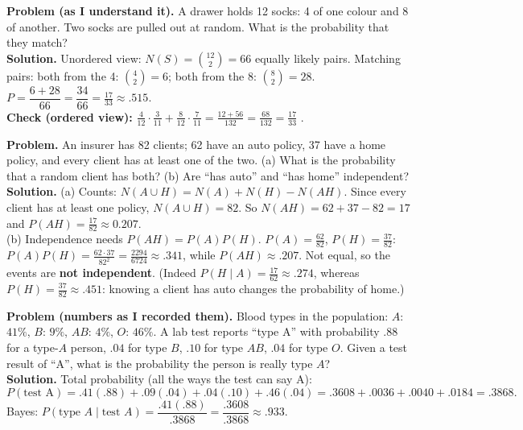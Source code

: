 \documentclass[11pt]{article}
\begin{document}
\begin{exbox}[\#5 Socks]
\textbf{Problem (as I understand it).} A drawer holds 12 socks: 4 of one colour and 8 of another. Two socks are pulled out at random. What is the probability that they match?\\
\textbf{Solution.} Unordered view: $N(S)=\binom{12}2=66$ equally likely pairs. Matching pairs: both from the 4: $\binom42=6$; both from the 8: $\binom82=28$. $P=\dfrac{6+28}{66}=\dfrac{34}{66}=\boxed{\tfrac{17}{33}}\approx.515$.\\
\textbf{Check (ordered view):} $\tfrac4{12}\cdot\tfrac3{11}+\tfrac8{12}\cdot\tfrac7{11}=\tfrac{12+56}{132}=\tfrac{68}{132}=\tfrac{17}{33}$ \checkmark.
\end{exbox}

\begin{exbox}
\textbf{Problem.} An insurer has 82 clients; 62 have an auto policy, 37 have a home policy, and every client has at least one of the two. (a) What is the probability that a random client has both? (b) Are ``has auto'' and ``has home'' independent?\\
\textbf{Solution.} (a) Counts: $N(A\cup H)=N(A)+N(H)-N(AH)$. Since every client has at least one policy, $N(A\cup H)=82$. So $N(AH)=62+37-82=17$ and $P(AH)=\tfrac{17}{82}\approx\boxed{0.207}$.\\
(b) Independence needs $P(AH)=P(A)P(H)$. $P(A)=\tfrac{62}{82}$, $P(H)=\tfrac{37}{82}$: $P(A)P(H)=\tfrac{62\cdot37}{82^2}=\tfrac{2294}{6724}\approx.341$, while $P(AH)\approx.207$. Not equal, so the events are \textbf{not independent}. (Indeed $P(H\mid A)=\tfrac{17}{62}\approx.274$, whereas $P(H)=\tfrac{37}{82}\approx.451$: knowing a client has auto changes the probability of home.)
\end{exbox}

\begin{exbox}
\textbf{Problem (numbers as I recorded them).} Blood types in the population: $A$: $41\%$, $B$: $9\%$, $AB$: $4\%$, $O$: $46\%$. A lab test reports ``type A'' with probability $.88$ for a type-$A$ person, $.04$ for type $B$, $.10$ for type $AB$, $.04$ for type $O$. Given a test result of ``A'', what is the probability the person is really type $A$?\\
\textbf{Solution.} Total probability (all the ways the test can say A):
\[ P(\text{test A})=.41(.88)+.09(.04)+.04(.10)+.46(.04)=.3608+.0036+.0040+.0184=.3868. \]
Bayes: $P(\text{type }A\mid\text{test }A)=\dfrac{.41(.88)}{.3868}=\dfrac{.3608}{.3868}\approx\boxed{.933}$.
\end{exbox}
\end{document}
